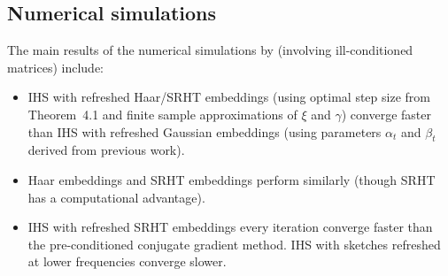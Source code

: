 \documentclass[10pt]{article}
\begin{document}
\subsection{Numerical simulations}

The main results of the numerical simulations by \citet{Lacotte:2020} (involving ill-conditioned matrices) include:
\begin{itemize}

\item
IHS with refreshed Haar/SRHT embeddings (using optimal step size from Theorem~4.1 and finite sample approximations of $\xi$ and $\gamma$) converge faster than IHS with refreshed Gaussian embeddings (using parameters $\alpha_t$ and $\beta_t$ derived from previous work).

\item
Haar embeddings and SRHT embeddings perform similarly (though SRHT has a computational advantage).

\item
IHS with refreshed SRHT embeddings every iteration converge faster than the pre-conditioned conjugate gradient method. IHS with sketches refreshed at lower frequencies converge slower.

\end{itemize}


\newpage



\end{document}
